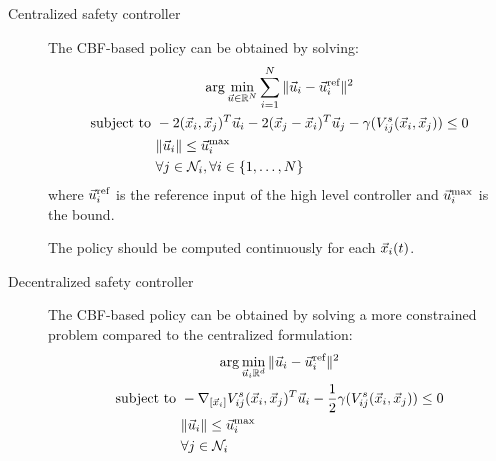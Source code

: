 \begin{description}
    \item[Centralized safety controller] 
        The CBF-based policy can be obtained by solving:
        \[
            \begin{gathered}
                \arg\min_{{\vec{u}} \in \mathbb{R}^N} \sum_{i=1}^{N} \Vert {\vec{u}}_i - {\vec{u}}_i^\text{ref} \Vert^2 \\
                \begin{aligned}
                    \text{subject to } 
                    &-2({\vec{x}}_i, {\vec{x}}_j)^T {\vec{u}}_i - 2({\vec{x}}_j-{\vec{x}}_i)^T {\vec{u}}_j - \gamma(V_{ij}^s({\vec{x}}_i, {\vec{x}}_j)) \leq 0 \\
                    & \Vert {\vec{u}}_i \Vert \leq {\vec{u}}_i^\text{max} \\
                    & \forall j \in \mathcal{N}_i, \forall i \in \{ 1, \dots, N \}
                \end{aligned}
            \end{gathered}
        \]
        where ${\vec{u}}_i^\text{ref}$ is the reference input of the high level controller and ${\vec{u}}_i^\text{max}$ is the bound.

        \begin{remark}
            The policy should be computed continuously for each ${\vec{x}}_i(t)$.
        \end{remark}

    \item[Decentralized safety controller] 
        The CBF-based policy can be obtained by solving a more constrained problem compared to the centralized formulation:
        \[
            \begin{gathered}
                \arg\min_{{\vec{u}}_i \mathbb{R}^d} \Vert {\vec{u}}_i - {\vec{u}}_i^\text{ref} \Vert^2 \\
                \begin{aligned}
                    \text{subject to } &- \nabla_{[{\vec{x}}_i]} V_{ij}^s({\vec{x}}_i, {\vec{x}}_j)^T {\vec{u}}_i - \frac{1}{2} \gamma (V_{ij}^s({\vec{x}}_i, {\vec{x}}_j)) \leq 0 \\
                    & \Vert {\vec{u}}_i \Vert \leq {\vec{u}}_i^\text{max} \\
                    & \forall j \in \mathcal{N}_i
                \end{aligned}
            \end{gathered}
        \]


\end{description}
